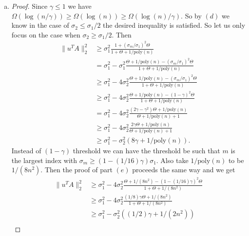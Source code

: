 \documentclass[11pt]{article}
\begin{document}
\begin{enumerate}[1.]
\begin{enumerate}[(a)]
\begin{proof}
\begin{align*}
  &\le \frac{\sum_{i=1}^n (g_i')^2 \sigma_i^{4r+4}}{\sum_{i=1}^m (g'_i)^2 \sigma_i^{4r+2} + (g'_1)^2 \sigma_1^{4r+2}/\text{poly}(n)}\\
  &\le \frac{\sum_{i=1}^n (g_i')^2 \sigma_i^{4r+4}}{\sum_{i=1}^m (g'_i)^2 \sigma_i^{4r+2} + \sum_{i=m+1}^n (g'_i)^2 \sigma_i^{4r+2}}\\
  &= \|u^T A\|_2^2. \qedhere
\end{align*}
\end{proof}
\item \begin{proof}
Since $\gamma \le 1$ we have $\Omega(\log(n/\gamma)) \ge \Omega(\log(n)) \ge \Omega(\log(n)/\gamma)$. So by $(d)$ we know in the case of $\sigma_2 \le \sigma_1/2$ the desired inequality is satisfied. So let us only focus on the case when $\sigma_2 \ge \sigma_1/2$. Then
\begin{align*}
  \|u^T A\|_2^2 &\ge \sigma_1^2 \frac{1 + (\sigma_m/\sigma_1)^2 \Theta}{1 + \Theta + 1/\text{poly}(n)}\\
  &= \sigma_1^2 - \sigma_1^2\frac{\Theta + 1/\text{poly}(n) - (\sigma_m/\sigma_1)^2 \Theta}{1 + \Theta + 1/\text{poly}(n)}\\
  &\ge \sigma_1^2 - 4\sigma_2^2\frac{\Theta + 1/\text{poly}(n) - (\sigma_m/\sigma_1)^2 \Theta}{1 + \Theta + 1/\text{poly}(n)}\\
  &\ge \sigma_1^2 - 4\sigma_2^2\frac{\Theta + 1/\text{poly}(n) - (1-\gamma)^2 \Theta}{1 + \Theta + 1/\text{poly}(n)}\\
  &= \sigma_1^2 - 4\sigma_2^2\frac{(2\gamma - \gamma^2)\Theta + 1/\text{poly}(n)}{\Theta + 1/\text{poly}(n) + 1}\\
  &\ge \sigma_1^2 - 4\sigma_2^2\frac{2\gamma\Theta + 1/\text{poly}(n)}{\Theta + 1/\text{poly}(n) + 1}\\
  &\ge \sigma_1^2 - \sigma_2^2 (8\gamma + 1/\text{poly}(n)).
\end{align*}
Instead of $(1-\gamma)$ threshold we can have the threshold be such that $m$ is the largest index with $\sigma_m \ge (1 - (1/16) \gamma)\sigma_1$. Also take $1/\text{poly}(n)$ to be $1/(8n^2)$. Then the proof of part $(e)$ proceeds the same way and we get
\begin{align*}
\|u^T A\|_2^2 &\ge \sigma_1^2 - 4\sigma_2^2 \frac{\Theta + 1/(8n^2) - (1 - (1/16)\gamma)^2 \Theta}{1 + \Theta + 1/(8n^2)}\\
&\ge \sigma_1^2 - 4\sigma_2^2 \frac{(1/8)\gamma \Theta + 1/(8n^2)}{1 + \Theta + 1/(8n^2)}\\
&\ge \sigma_1^2 - \sigma_2^2 ((1/2) \gamma + 1/(2n^2))\\

\end{align*}
\end{proof}
\end{enumerate}
\end{enumerate}
\end{document}

